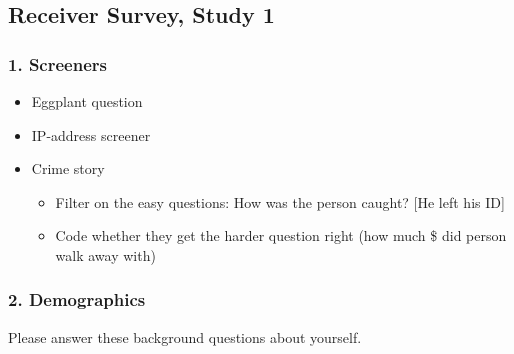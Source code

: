 \subsection{Receiver Survey, Study 1}
\subsubsection*{1. Screeners}
\begin{itemize}
    \item Eggplant question
    \item IP-address screener
    \item Crime story
    \begin{itemize}
        \item Filter on the easy questions: How was the person caught? [He left his ID]
        \item Code whether they get the harder question right (how much \$ did person walk away with)
    \end{itemize}
\end{itemize}

\subsubsection*{2. Demographics}
Please answer these background questions about yourself. 

